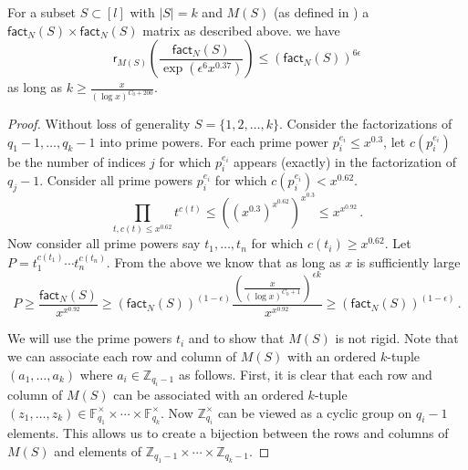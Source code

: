 \documentclass{toc}
\newcommand\F{{\mathbb{F}}}
\renewcommand\Z{{\mathbb{Z}}}
\renewcommand\fact{\textsf{fact}}
\begin{document}
\begin{lemma}\label{blockrigidity}
For a subset $S \subset [l]$ with $|S| = k$ and $M(S)$ (as defined in )  a  $\fact_N(S) \times \fact_N(S)$ matrix as described above.  we have 
\[
\textsf{r}_{M(S)}\left( \frac{\fact_N(S)}{\exp\left(\epsilon^6 x^{0.37}\right)} \right) \leq \left(\fact_N(S)\right)^{6 \epsilon}
\]
as long as $k \geq \frac{x}{(\log x)^{C_0 + 200}}$.
\end{lemma}
\begin{proof}
Without loss of generality $S = \{1,2, \dots , k \}$.  Consider the factorizations of $q_1-1, \dots , q_k-1$ into prime powers.  For each prime power $p_i^{e_i} \leq x^{0.3}$, let $c(p_i^{e_i})$ be the number of indices $j$ for which $p_i^{e_i}$ appears (exactly) in the factorization of $q_j-1$.  Consider all prime powers $p_i^{e_i}$ for which $c(p_i^{e_i}) < x^{0.62}$.
\[
 \prod_{t, c(t) \leq x^{0.62}} t^{c(t)} \leq \left((x^{0.3})^{x^{0.62}} \right)^{x^{0.3}} \leq x^{x^{0.92}} \,.
\]
Now consider all prime powers say $t_1, \dots , t_n$ for which $c(t_i) \geq x^{0.62}$.  Let $P = t_1^{c(t_1)} \cdots t_n^{c(t_n)}$.  {}From the above we know that as long as $x$ is sufficiently large
 \begin{equation}\label{separateprimepowers}
P \geq \frac{\fact_N(S)}{x^{x^{0.92}} } \geq \left(\fact_N(S)\right)^{(1 - \epsilon)} \frac{\left(\frac{x}{(\log x)^{C_0 + 1}} \right)^{\epsilon k}}{x^{x^{0.92}} } \geq \left(\fact_N(S)\right)^{(1 - \epsilon)} \,.
 \end{equation}

We will use the prime powers $t_i$ and  to show that $M(S)$ is not rigid.  Note that we can associate each row and column of $M(S)$ %
with  %
an ordered $k$-tuple $(a_1, \dots , a_k)$ where $a_i \in \Z_{q_i-1}$ as follows. First, it is clear that each row and column of $M(S)$ can be associated
%
with  %
an ordered $k$-tuple 
%
%
$(z_1, \dots , z_k) \in \F_{q_1}^{\times} \times \cdots \times \F_{q_k}^{\times}$.
Now $\Z_{q_i}^{\times}$ can be viewed as a cyclic group on $q_i-1$ elements.  This allows us to create a bijection between the rows and columns of $M(S)$ and elements of $\Z_{q_1-1} \times \cdots \times \Z_{q_k-1}$.


\end{proof}
\end{document}
